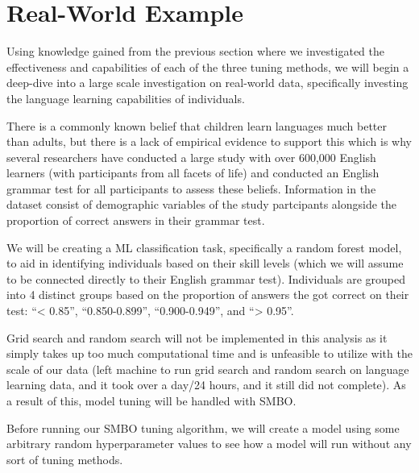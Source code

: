 \documentclass[12pt]{article}
\begin{document}
\newpage

\hypertarget{real-world-example}{%
\section{Real-World Example}\label{real-world-example}}

\label{sec:realworld}

Using knowledge gained from the previous section where we investigated
the effectiveness and capabilities of each of the three tuning methods,
we will begin a deep-dive into a large scale investigation on real-world
data, specifically investing the language learning capabilities of
individuals.

There is a commonly known belief that children learn languages much
better than adults, but there is a lack of empirical evidence to support
this which is why several researchers have conducted a large study with
over 600,000 English learners (with participants from all facets of
life) and conducted an English grammar test for all participants to
assess these beliefs. Information in the dataset consist of demographic
variables of the study partcipants alongside the proportion of correct
answers in their grammar test.

We will be creating a ML classification task, specifically a random
forest model, to aid in identifying individuals based on their skill
levels (which we will assume to be connected directly to their English
grammar test). Individuals are grouped into 4 distinct groups based on
the proportion of answers the got correct on their test: ``\textless{}
0.85'', ``0.850-0.899'', ``0.900-0.949'', and ``\textgreater{} 0.95''.

Grid search and random search will not be implemented in this analysis
as it simply takes up too much computational time and is unfeasible to
utilize with the scale of our data (left machine to run grid search and
random search on language learning data, and it took over a day/24
hours, and it still did not complete). As a result of this, model tuning
will be handled with SMBO.

\newpage

Before running our SMBO tuning algorithm, we will create a model using
some arbitrary random hyperparameter values to see how a model will run
without any sort of tuning methods.
\end{document}
